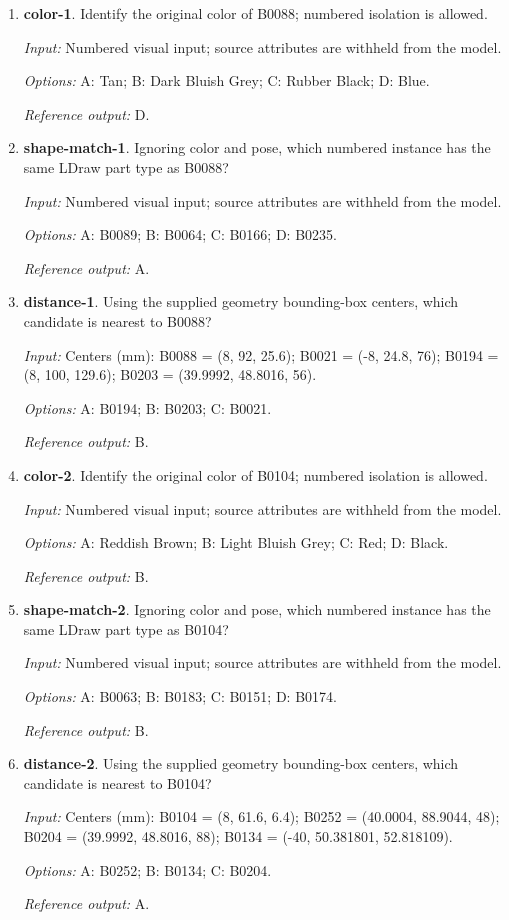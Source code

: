 \begin{enumerate}
\item \textbf{color-1}. Identify the original color of B0088; numbered isolation is allowed.\par {\small \textit{Input:} Numbered visual input; source attributes are withheld from the model. \par\textit{Options:} A: Tan; B: Dark Bluish Grey; C: Rubber Black; D: Blue. \par\textit{Reference output:} D.}
\item \textbf{shape-match-1}. Ignoring color and pose, which numbered instance has the same LDraw part type as B0088?\par {\small \textit{Input:} Numbered visual input; source attributes are withheld from the model. \par\textit{Options:} A: B0089; B: B0064; C: B0166; D: B0235. \par\textit{Reference output:} A.}
\item \textbf{distance-1}. Using the supplied geometry bounding-box centers, which candidate is nearest to B0088?\par {\small \textit{Input:} Centers (mm): B0088 = (8, 92, 25.6); B0021 = (-8, 24.8, 76); B0194 = (8, 100, 129.6); B0203 = (39.9992, 48.8016, 56). \par\textit{Options:} A: B0194; B: B0203; C: B0021. \par\textit{Reference output:} B.}
\item \textbf{color-2}. Identify the original color of B0104; numbered isolation is allowed.\par {\small \textit{Input:} Numbered visual input; source attributes are withheld from the model. \par\textit{Options:} A: Reddish Brown; B: Light Bluish Grey; C: Red; D: Black. \par\textit{Reference output:} B.}
\item \textbf{shape-match-2}. Ignoring color and pose, which numbered instance has the same LDraw part type as B0104?\par {\small \textit{Input:} Numbered visual input; source attributes are withheld from the model. \par\textit{Options:} A: B0063; B: B0183; C: B0151; D: B0174. \par\textit{Reference output:} B.}
\item \textbf{distance-2}. Using the supplied geometry bounding-box centers, which candidate is nearest to B0104?\par {\small \textit{Input:} Centers (mm): B0104 = (8, 61.6, 6.4); B0252 = (40.0004, 88.9044, 48); B0204 = (39.9992, 48.8016, 88); B0134 = (-40, 50.381801, 52.818109). \par\textit{Options:} A: B0252; B: B0134; C: B0204. \par\textit{Reference output:} A.}

\end{enumerate}
